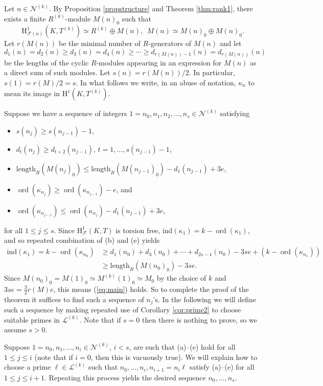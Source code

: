 \documentclass[10pt]{amsart}
\numberwithin{equation}{section}
\theoremstyle{definition}
\theoremstyle{remark}
\newcommand{\rH}{\mathrm{H}}
\DeclareMathOperator{\ord}{ord}
\newcommand{\CF}{\mathcal{F}}
\newcommand{\CL}{\mathscr{L}}
\newcommand{\CN}{\mathscr{N}}
\newcommand{\kap}{\kappa}
\newcommand{\ind}{\mathrm{ind}}
\begin{document}
Let $n\in \CN^{(k)}$.
By Proposition \ref{propstructure} and Theorem \ref{thm:rank1}, there exists a finite $R^{(k)}$-module $M(n)_0$ such that 
$$
\rH^1_{\CF(n)}(K,T^{(k)}) \simeq R^{(k)}\oplus M(n), \ \ M(n) \simeq M(n)_0\oplus M(n)_0.
$$
Let $r(M(n))$ be the minimal number of $R$-generators of $M(n)$ and let
\[
d_1(n)= d_2(n)\geqslant d_3(n)= d_4(n)\geqslant\cdots \geqslant d_{r(M(n))-1}(n)= d_{r(M(n))}(n)
\]
be the lengths of the cyclic $R$-modules appearing in an expression 
for $M(n)$ as a direct sum of such modules. 
Let $s(n) = r(M(n))/2$. In particular, $s(1) = r(M)/2 = s$.  
In what follows we write, in an abuse of notation, $\kap_n$ to mean its image 
in $\rH^1(K,T^{(k)})$.

Suppose we have a sequence of integers $1=n_0,n_1,n_2,\dots,n_s\in \CN^{(k)}$ satisfying
\begin{itemize} 
\item[(a)] $s(n_j)\geqslant s(n_{j-1})-1$,
\item[(b)] $d_t(n_j) \geqslant d_{t+2}(n_{j-1})$, $t=1,\dots,s(n_{j-1})-1$,
\item[(c)] $\mathrm{length}_R(M(n_j)_0) \leqslant \mathrm{length}_R(M(n_{j-1})_0) - 
d_1(n_{j-1}) + 3e$,
\item[(d)] $\ord(\kap_{n_j}) \geqslant \ord(\kap_{n_{j-1}}) - e$, and
\item[(e)] $\ord(\kap_{n_{j-1}}) \leqslant \ord(\kap_{n_{j}}) - d_1(n_{j-1}) + 3e$,
\end{itemize}
for all $1\leqslant j\leqslant s$. 
Since $\rH^1_{\CF}(K,T)$ is torsion free, $\ind(\kap_1) = k - \ord(\kap_1)$, and so
repeated combination of (b) and (e) yields
\begin{align*}
\ind(\kap_1) = k -\ord(\kap_{n_0}) &\geqslant d_1(n_0) + d_3(n_0) + \cdots + d_{2s-1}(n_0) - 3se  
+ (k-\ord(\kap_{n_s}))\\
& \geqslant \mathrm{length}_R(M(n_0)_0) - 3se.
\end{align*}
Since $M(n_0)_0 = M(1)_0 \simeq M^{(k)}(1)_0\simeq M_0$ by the choice of $k$ and $3se = \frac{3}{2}r(M)e$, this means (\ref{eq:main}) holds.  
So to complete the proof of the theorem it suffices to find such a sequence of $n_j$'s.
In the following we will define such a sequence by making repeated use of Corollary \ref{cor:prime2}
to choose suitable primes in $\CL^{(k)}$. Note that if $s=0$ then there is nothing to prove, so we assume $s>0$.

Suppose $1=n_0,n_1,\dots,n_i \in \CN^{(k)}$, $i<s$, are such that (a)--(e) hold for all $1\leqslant j\leqslant i$ (note that if $i=0$, then this is
vacuously true).  We will explain how to choose a prime $\ell\in \CL^{(k)}$ such that $n_0,\dots,n_i,n_{i+1}=n_i\ell$
satisfy (a)--(e) for all $1\leqslant j\leqslant i+1$. Repeating this process yields the desired sequence $n_0,\dots,n_s$.
\end{document}
